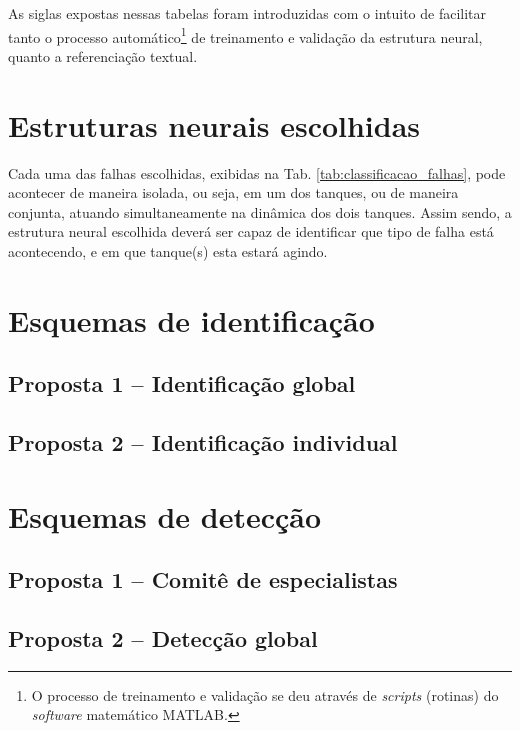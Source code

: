 As siglas expostas nessas tabelas foram introduzidas com o intuito de facilitar
tanto o processo automático\footnote{O processo de treinamento e validação se
deu através de {\it scripts} (rotinas) do {\it software} matemático MATLAB\reg.}
de treinamento e validação da estrutura neural, quanto a referenciação textual.


\section{Estruturas neurais escolhidas}
Cada uma das falhas escolhidas, exibidas na Tab.
\ref{tab:classificacao_falhas}, pode acontecer de maneira isolada, ou seja, em
um dos tanques, ou de maneira conjunta, atuando simultaneamente na dinâmica dos
dois tanques. Assim sendo, a estrutura neural escolhida deverá ser capaz de
identificar que tipo de falha está acontecendo, e em que tanque(s) esta estará
agindo.

\section{Esquemas de identificação}

\subsection{Proposta 1 -- Identificação global}

\subsection{Proposta 2 -- Identificação individual}

\section{Esquemas de detecção}

\subsection{Proposta 1 -- Comitê de especialistas}

\subsection{Proposta 2 -- Detecção global}
